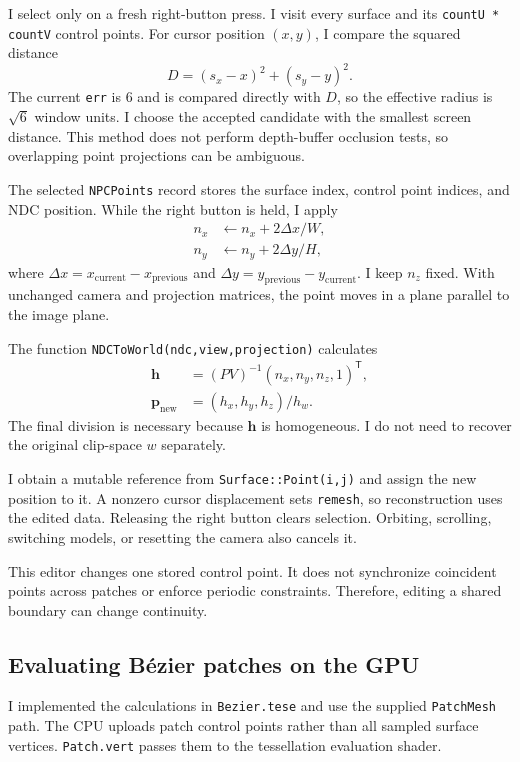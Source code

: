 \documentclass[acmtog]{acmart}
\begin{document}
I select only on a fresh right-button press. I visit every surface and its \texttt{countU * countV} control points. For cursor position $(x,y)$, I compare the squared distance
\begin{equation}
D=(s_x-x)^2+(s_y-y)^2.
\end{equation}
The current \texttt{err} is 6 and is compared directly with $D$, so the effective radius is $\sqrt{6}$ window units. I choose the accepted candidate with the smallest screen distance. This method does not perform depth-buffer occlusion tests, so overlapping point projections can be ambiguous.

The selected \texttt{NPCPoints} record stores the surface index, control point indices, and NDC position. While the right button is held, I apply
\begin{equation}
\begin{aligned}
n_x&\leftarrow n_x+2\Delta x/W,\\
n_y&\leftarrow n_y+2\Delta y/H,
\end{aligned}
\end{equation}
where $\Delta x=x_{\mathrm{current}}-x_{\mathrm{previous}}$ and $\Delta y=y_{\mathrm{previous}}-y_{\mathrm{current}}$. I keep $n_z$ fixed. With unchanged camera and projection matrices, the point moves in a plane parallel to the image plane.

The function \texttt{NDCToWorld(ndc,view,projection)} calculates
\begin{equation}
\begin{aligned}
\mathbf h&=(PV)^{-1}(n_x,n_y,n_z,1)^{\mathsf T},\\
\mathbf p_{\mathrm{new}}&=(h_x,h_y,h_z)/h_w.
\end{aligned}
\end{equation}
The final division is necessary because $\mathbf h$ is homogeneous. I do not need to recover the original clip-space $w$ separately.

I obtain a mutable reference from \texttt{Surface::Point(i,j)} and assign the new position to it. A nonzero cursor displacement sets \texttt{remesh}, so reconstruction uses the edited data. Releasing the right button clears selection. Orbiting, scrolling, switching models, or resetting the camera also cancels it.

This editor changes one stored control point. It does not synchronize coincident points across patches or enforce periodic constraints. Therefore, editing a shared boundary can change continuity.

\subsection{Evaluating B\'ezier patches on the GPU}
I implemented the calculations in \texttt{Bezier.tese} and use the supplied \texttt{PatchMesh} path. The CPU uploads patch control points rather than all sampled surface vertices. \texttt{Patch.vert} passes them to the tessellation evaluation shader.
\end{document}
